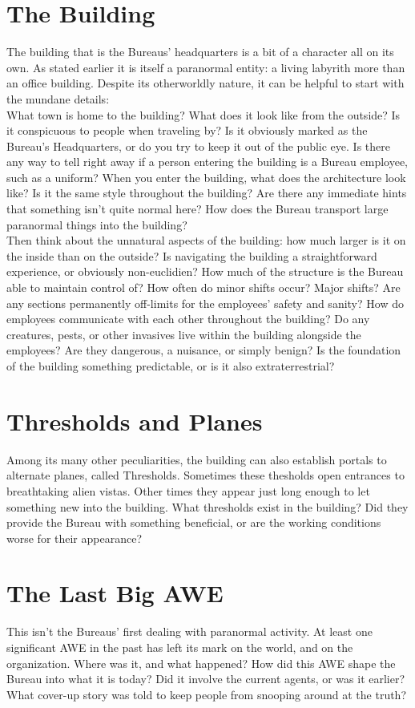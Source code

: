 \documentclass[10pt,oneside,landscape]{memoir}
\begin{document}
\begin{multicols}{2}
\section*{The Building}
The building that is the Bureaus' headquarters is a bit of a character all on its own.  As stated earlier it is itself a paranormal entity: a living labyrith more than an office building.  Despite its otherworldly nature, it can be helpful to start with the mundane details:
\\[4mm]
What town is home to the building?  What does it look like from the outside?  Is it conspicuous to people when traveling by?  Is it obviously marked as the Bureau's Headquarters, or do you try to keep it out of the public eye.  Is there any way to tell right away if a person entering the building is a Bureau employee, such as a uniform?  When you enter the building, what does the architecture look like?  Is it the same style throughout the building?  Are there any immediate hints that something isn't quite normal here?  How does the Bureau transport large paranormal things into the building?
\\[4mm]
Then think about the unnatural aspects of the building: how much larger is it on the inside than on the outside?  Is navigating the building a straightforward experience, or obviously non-euclidien?  How much of the structure is the Bureau able to maintain control of?  How often do minor shifts occur?  Major shifts?  Are any sections permanently off-limits for the employees' safety and sanity?  How do employees communicate with each other throughout the building?  Do any creatures, pests, or other invasives live within the building alongside the employees?  Are they dangerous, a nuisance, or simply benign?  Is the foundation of the building something predictable, or is it also extraterrestrial?
%
\section*{Thresholds and Planes}
Among its many other peculiarities, the building can also establish portals to alternate planes, called Thresholds.   Sometimes these thesholds open entrances to breathtaking alien vistas.  Other times they appear just long enough to let something new into the building.  What thresholds exist in the building?  Did they provide the Bureau with something beneficial, or are the working conditions worse for their appearance?
%
\section*{The Last Big AWE}
This isn't the Bureaus' first dealing with paranormal activity.  At least one significant AWE in the past has left its mark on the world, and on the organization.  Where was it, and what happened?  How did this AWE shape the Bureau into what it is today?  Did it involve the current agents, or was it earlier?  What cover-up story was told to keep people from snooping around at the truth?
%
\end{multicols}
%
\pagebreak
%
%
\end{document}
